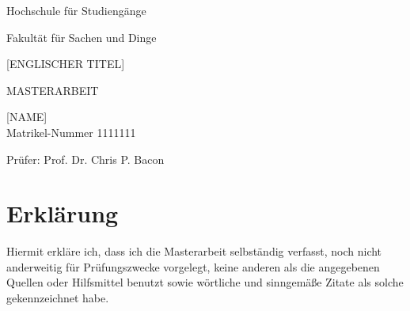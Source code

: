 
\pagestyle{empty}


\begin{center}

\begin{Huge} 
Hochschule für Studiengänge \\
\end{Huge}

\begin{Large}
Fakultät für Sachen und Dinge \\
\end{Large}

\vspace{20mm}

\begin{Large}
[TITEL]

\vspace{2cm}
 
[ENGLISCHER TITEL]

\end{Large}



\vspace{1cm}

MASTERARBEIT\\

\vspace{4.5cm}

[NAME] \\
Matrikel-Nummer 1111111 \\

\vspace{4cm}

Prüfer: Prof. Dr. Chris P. Bacon\\


\end{center}
\clearpage

\pagestyle{useheadings} %

\chapter*{Erklärung}
Hiermit erkläre ich, dass ich die Masterarbeit selbständig verfasst, noch nicht anderweitig für Prüfungszwecke vorgelegt, keine anderen als die angegebenen Quellen oder Hilfsmittel benutzt sowie wörtliche und sinngemäße Zitate als solche gekennzeichnet habe.
\vspace{3cm}

